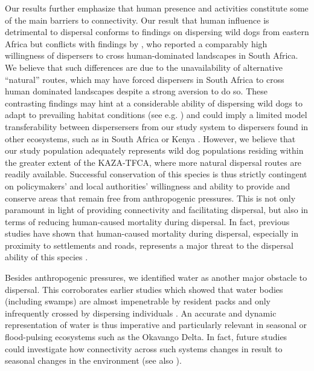 \documentclass[abstract=on,10pt,a4paper,bibliography=totocnumbered]{article}
\begin{document}
Our results further emphasize that human presence and activities constitute some
of the main barriers to connectivity. Our result that human influence is
detrimental to dispersal conforms to findings on dispersing wild dogs from
eastern Africa \citep{Masenga.2016, Oneill.2020} but conflicts with findings by
\cite{DaviesMostert.2012}, who reported a comparably high willingness of
dispersers to cross human-dominated landscapes in South Africa. We believe that
such differences are due to the unavailability of alternative ``natural''
routes, which may have forced dispersers in South Africa to cross human
dominated landscapes despite a strong aversion to do so. These contrasting
findings may hint at a considerable ability of dispersing wild dogs to adapt to
prevailing habitat conditions (see e.g. \cite{Woodroffe.2011}) and could imply a
limited model transferability between dispersersers from our study system to
dispersers found in other ecosystems, such as in South Africa
\citep{Whittington.2011, DaviesMostert.2012} or Kenya \citep{Woodroffe.2019,
Oneill.2020}. However, we believe that our study population adequately
represents wild dog populations residing within the greater extent of the
KAZA-TFCA, where more natural dispersal routes are readily available. Successful
conservation of this species is thus strictly contingent on policymakers' and
local authorities' willingness and ability to provide and conserve areas that
remain free from anthropogenic pressures. This is not only paramount in light of
providing connectivity and facilitating dispersal, but also in terms of reducing
human-caused mortality during dispersal. In fact, previous studies have shown
that human-caused mortality during dispersal, especially in proximity to
settlements and roads, represents a major threat to the dispersal ability of
this species \citep{Woodroffe.2019, Cozzi.2020}.

Besides anthropogenic pressures, we identified water as another major obstacle
to dispersal. This corroborates earlier studies which showed that water bodies
(including swamps) are almost impenetrable by resident packs
\citep{Abrahms.2017, Cozzi.2020} and only infrequently crossed by dispersing
individuals \citep{Cozzi.2020}. An accurate and dynamic representation of water
is thus imperative and particularly relevant in seasonal or flood-pulsing
ecosystems such as the Okavango Delta. In fact, future studies could investigate
how connectivity across such systems changes in result to seasonal changes in
the environment (see also \cite{Osipova.2019}).
\end{document}
